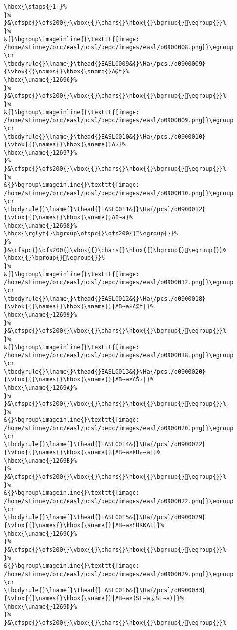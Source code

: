 \begin{verbatim}
\hbox{\stags{}1-}%
}%
}&\ofspc{}\ofs200{}\vbox{{}\chars{}\hbox{{}\bgroup{}󲛩\egroup{}}%
}%
&{}\bgroup\imageinline{}\texttt{[image: /home/stinney/orc/easl/pcsl/pepc/images/easl/o0900008.png]}\egroup
\cr
\tbodyrule{}\lname{}\thead{}EASL0009&{}\Ha{/pcsl/o0900009}{\vbox{{}\names{}\hbox{\sname{}A@t}%
\hbox{\uname{}12696}%
}%
}&\ofspc{}\ofs200{}\vbox{{}\chars{}\hbox{{}\bgroup{}𒚖\egroup{}}%
}%
&{}\bgroup\imageinline{}\texttt{[image: /home/stinney/orc/easl/pcsl/pepc/images/easl/o0900009.png]}\egroup
\cr
\tbodyrule{}\lname{}\thead{}EASL0010&{}\Ha{/pcsl/o0900010}{\vbox{{}\names{}\hbox{\sname{}A₂}%
\hbox{\uname{}12697}%
}%
}&\ofspc{}\ofs200{}\vbox{{}\chars{}\hbox{{}\bgroup{}𒚗\egroup{}}%
}%
&{}\bgroup\imageinline{}\texttt{[image: /home/stinney/orc/easl/pcsl/pepc/images/easl/o0900010.png]}\egroup
\cr
\tbodyrule{}\lname{}\thead{}EASL0011&{}\Ha{/pcsl/o0900012}{\vbox{{}\names{}\hbox{\sname{}AB∼a}%
\hbox{\uname{}12698}%
\hbox{\rglyf{}\bgroup\ofspc{}\ofs200{}𒚘\egroup{}}%
}%
}&\ofspc{}\ofs200{}\vbox{{}\chars{}\hbox{{}\bgroup{}𒚢\egroup{}}%
\hbox{{}\bgroup{}𒚘\egroup{}}%
}%
&{}\bgroup\imageinline{}\texttt{[image: /home/stinney/orc/easl/pcsl/pepc/images/easl/o0900012.png]}\egroup
\cr
\tbodyrule{}\lname{}\thead{}EASL0012&{}\Ha{/pcsl/o0900018}{\vbox{{}\names{}\hbox{\sname{}|AB∼a×A@t|}%
\hbox{\uname{}12699}%
}%
}&\ofspc{}\ofs200{}\vbox{{}\chars{}\hbox{{}\bgroup{}𒚙\egroup{}}%
}%
&{}\bgroup\imageinline{}\texttt{[image: /home/stinney/orc/easl/pcsl/pepc/images/easl/o0900018.png]}\egroup
\cr
\tbodyrule{}\lname{}\thead{}EASL0013&{}\Ha{/pcsl/o0900020}{\vbox{{}\names{}\hbox{\sname{}|AB∼a×AŠ₂|}%
\hbox{\uname{}1269A}%
}%
}&\ofspc{}\ofs200{}\vbox{{}\chars{}\hbox{{}\bgroup{}𒚚\egroup{}}%
}%
&{}\bgroup\imageinline{}\texttt{[image: /home/stinney/orc/easl/pcsl/pepc/images/easl/o0900020.png]}\egroup
\cr
\tbodyrule{}\lname{}\thead{}EASL0014&{}\Ha{/pcsl/o0900022}{\vbox{{}\names{}\hbox{\sname{}|AB∼a×KU₆∼a|}%
\hbox{\uname{}1269B}%
}%
}&\ofspc{}\ofs200{}\vbox{{}\chars{}\hbox{{}\bgroup{}𒚛\egroup{}}%
}%
&{}\bgroup\imageinline{}\texttt{[image: /home/stinney/orc/easl/pcsl/pepc/images/easl/o0900022.png]}\egroup
\cr
\tbodyrule{}\lname{}\thead{}EASL0015&{}\Ha{/pcsl/o0900029}{\vbox{{}\names{}\hbox{\sname{}|AB∼a×SUKKAL|}%
\hbox{\uname{}1269C}%
}%
}&\ofspc{}\ofs200{}\vbox{{}\chars{}\hbox{{}\bgroup{}𒚜\egroup{}}%
}%
&{}\bgroup\imageinline{}\texttt{[image: /home/stinney/orc/easl/pcsl/pepc/images/easl/o0900029.png]}\egroup
\cr
\tbodyrule{}\lname{}\thead{}EASL0016&{}\Ha{/pcsl/o0900033}{\vbox{{}\names{}\hbox{\sname{}|AB∼a×(ŠE∼a﹠ŠE∼a)|}%
\hbox{\uname{}1269D}%
}%
}&\ofspc{}\ofs200{}\vbox{{}\chars{}\hbox{{}\bgroup{}𒚝\egroup{}}%

\end{verbatim}
